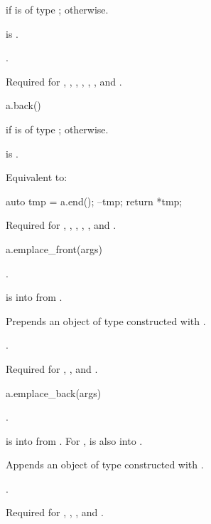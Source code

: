 \begin{itemdescr}
\pnum
\result
{} if  is of type ;
 otherwise.

\pnum
\hardexpects
{} is .

\pnum
\returns
{}.

\pnum
\remarks
Required for
,
,
,
,
,
, and
.
\end{itemdescr}

\begin{itemdecl}
a.back()
\end{itemdecl}

\begin{itemdescr}
\pnum
\result
{} if  is of type ;
 otherwise.

\pnum
\hardexpects
{} is .

\pnum
\effects
Equivalent to:
\begin{codeblock}
auto tmp = a.end();
--tmp;
return *tmp;
\end{codeblock}

\pnum
\remarks
Required for
,
,
,
,
, and
.
\end{itemdescr}

\begin{itemdecl}
a.emplace_front(args)
\end{itemdecl}

\begin{itemdescr}
\pnum
\result
{}.

\pnum
\expects
{} is  into  from .

\pnum
\effects
Prepends an object of type 
constructed with .

\pnum
\returns
{}.

\pnum
\remarks
Required for
,
, and
.
\end{itemdescr}

\begin{itemdecl}
a.emplace_back(args)
\end{itemdecl}

\begin{itemdescr}
\pnum
\result
{}.

\pnum
\expects
{} is  into  from .
For ,
 is also  into .

\pnum
\effects
Appends an object of type 
constructed with .

\pnum
\returns
{}.

\pnum
\remarks
Required for
,
,
, and
.
\end{itemdescr}

